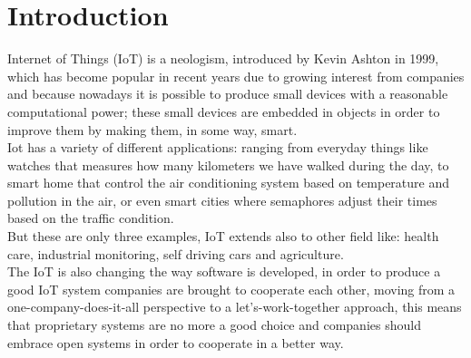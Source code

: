 	\section{Introduction}
	Internet of Things (IoT) is a neologism, introduced by Kevin Ashton in 1999, which has become popular in recent years due to
	growing interest from companies and because nowadays it is possible to produce small devices with a reasonable computational power;
	these small devices are embedded in objects in order to improve them by making them, in some way, smart.\\
	
	Iot has a variety of different applications: ranging from everyday things like watches that measures how many kilometers we have walked during the day, to smart home that control the air conditioning system based on temperature and pollution in the air, or even smart cities where semaphores adjust their times based on the traffic condition.\\
	But these are only three examples, IoT extends also to other field like: health care, industrial monitoring, self driving cars and agriculture.\\
	
	The IoT is also changing the way software is developed, in order to produce a good IoT system companies are brought to cooperate each other,
	moving from a one-company-does-it-all perspective to a let’s-work-together approach\cite{successiot}, this means that proprietary systems 
	are no more a good choice and companies should embrace open systems in order to cooperate in a better way.\\
	
